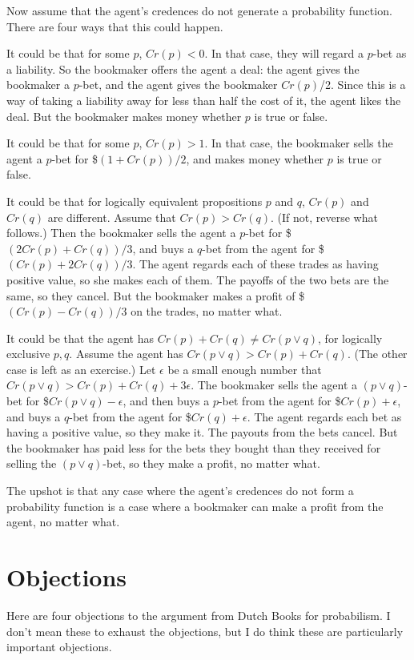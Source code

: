 Now assume that the agent's credences do not generate a probability function. There are four ways that this could happen.

\begin{enumerate*}
\item It could be that for some $p$, $Cr(p) < 0$. In that case, they will regard a $p$-bet as a liability. So the bookmaker offers the agent a deal: the agent gives the bookmaker a $p$-bet, and the agent gives the bookmaker $Cr(p)$/2. Since this is a way of taking a liability away for less than half the cost of it, the agent likes the deal. But the bookmaker makes money whether $p$ is true or false.
\item It could be that for some $p$, $Cr(p) > 1$. In that case, the bookmaker sells the agent a $p$-bet for \$$(1 + Cr(p))/2$, and makes money whether $p$ is true or false.
\item It could be that for logically equivalent propositions $p$ and $q$, $Cr(p)$ and $Cr(q)$ are different. Assume that $Cr(p) > Cr(q)$. (If not, reverse what follows.) Then the bookmaker sells the agent a $p$-bet for \$$(2Cr(p) + Cr(q))/3$, and buys a $q$-bet from the agent for \$$(Cr(p) + 2Cr(q))/3$. The agent regards each of these trades as having positive value, so she makes each of them. The payoffs of the two bets are the same, so they cancel. But the bookmaker makes a profit of \$$(Cr(p) - Cr(q))/3$ on the trades, no matter what.
\item It could be that the agent has $Cr(p) + Cr(q) \neq Cr(p \vee q)$, for logically exclusive $p, q$. Assume the agent has $Cr(p \vee q) > Cr(p) + Cr(q)$. (The other case is left as an exercise.) Let $\epsilon$ be a small enough number that $Cr(p \vee q) > Cr(p) + Cr(q) + 3\epsilon$. The bookmaker sells the agent a $(p \vee q)$-bet for \$$Cr(p \vee q) - \epsilon$, and then buys a $p$-bet from the agent for \$$Cr(p) + \epsilon$, and buys a $q$-bet from the agent for \$$Cr(q) + \epsilon$. The agent regards each bet as having a positive value, so they make it. The payouts from the bets cancel. But the bookmaker has paid less for the bets they bought than they received for selling the $(p \vee q)$-bet, so they make a profit, no matter what.
\end{enumerate*}
The upshot is that any case where the agent's credences do not form a probability function is a case where a bookmaker can make a profit from the agent, no matter what.

\section{Objections}
Here are four objections to the argument from Dutch Books for probabilism. I don't mean these to exhaust the objections, but I do think these are particularly important objections.

